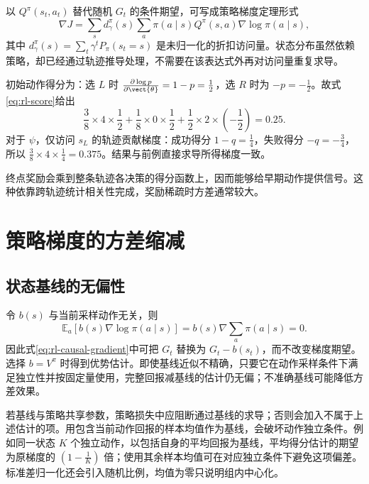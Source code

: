 \documentclass[../textbook.tex]{subfiles}
\begin{document}
以 $Q^\pi(s_t,a_t)$ 替代随机 $G_t$ 的条件期望，可写成策略梯度定理形式
\begin{equation}
 \nabla J=\sum_s d_\gamma^\pi(s)\sum_a\pi(a\mid s)Q^\pi(s,a)\nabla\log\pi(a\mid s),
\end{equation}
其中 $d_\gamma^\pi(s)=\sum_t\gamma^tP_\pi(s_t=s)$ 是未归一化的折扣访问量。状态分布虽然依赖策略，却已经通过轨迹推导处理，不需要在该表达式外再对访问量重复求导。

\begin{example}[两步决策过程的策略梯度]


初始动作得分为：选 $L$ 时 $\frac{\partial\log p}{\partial\vect{\theta}}=1-p=\frac{1}{2}$，选 $R$ 时为 $-p=-\frac{1}{2}$。故式\eqref{eq:rl-score}给出
\begin{equation*}
 \frac38\times4\times\frac12+
 \frac18\times0\times\frac12+
 \frac12\times2\times\left(-\frac12\right)=0.25.
\end{equation*}
对于 $\psi$，仅访问 $s_L$ 的轨迹贡献梯度：成功得分 $1-q=\frac{1}{4}$，失败得分 $-q=-\frac{3}{4}$，所以 $\tfrac38\times4\times\tfrac14=0.375$。结果与前例直接求导所得梯度一致。

终点奖励会乘到整条轨迹各决策的得分函数上，因而能够给早期动作提供信号。这种依靠跨轨迹统计相关性完成，奖励稀疏时方差通常较大。
\end{example}

\section{策略梯度的方差缩减}

\subsection{状态基线的无偏性}
令 $b(s)$ 与当前采样动作无关，则
\begin{equation}
 \mathbb E_a[b(s)\nabla\log\pi(a\mid s)]
 =b(s)\nabla\sum_a\pi(a\mid s)=0.
\end{equation}
因此式\eqref{eq:rl-causal-gradient}中可把 $G_t$ 替换为 $G_t-b(s_t)$，而不改变梯度期望。选择 $b=V^\pi$ 时得到优势估计。即使基线近似不精确，只要它在动作采样条件下满足独立性并按固定量使用，完整回报减基线的估计仍无偏；不准确基线可能降低方差效果。

若基线与策略共享参数，策略损失中应阻断通过基线的求导；否则会加入不属于上述估计的项。用包含当前动作回报的样本均值作为基线，会破坏动作独立条件。例如同一状态 $K$ 个独立动作，以包括自身的平均回报为基线，平均得分估计的期望为原梯度的 $(1-\frac{1}{K})$ 倍；使用其余样本均值可在对应独立条件下避免这项偏差。标准差归一化还会引入随机比例，均值为零只说明组内中心化。
\end{document}
